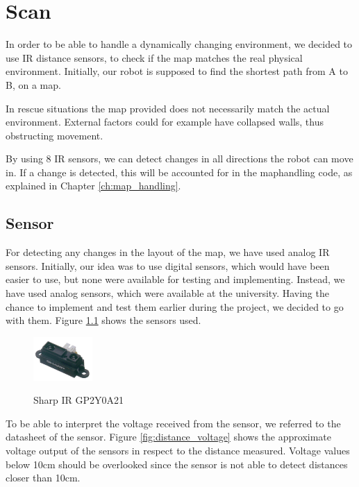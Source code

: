 \chapter{Scan}\label{ch:scan}
In order to be able to handle a dynamically changing environment,
we decided to use IR distance sensors,
to check if the map matches the real physical environment.
Initially, our robot is supposed to find the 
shortest path from A to B, on a map.

In rescue situations the map provided does not necessarily match 
the actual environment.
External factors could for example have collapsed walls,
thus obstructing movement.

By using 8 IR sensors, we can detect changes in all directions 
the robot can move in. If a change is detected, this will be
accounted for in the maphandling code,
as explained in Chapter \ref{ch:map_handling}.

\newpage
\section{Sensor}\label{sec:sensor}
For detecting any changes in the layout of the map, we have used analog IR 
sensors. Initially, our idea was to use digital sensors, which would have been 
easier to use, but none were available for testing and implementing. Instead, 
we have used analog sensors, which were available at the university. Having the 
chance to implement and test them earlier during the project, we decided to go 
with them. 
Figure \ref{fig:sensor} shows the sensors used.

\begin{figure}[htp]
	\centering
	\includegraphics[width=0.2\textwidth]{figures/scan/Sensor.png}
	\caption{Sharp IR GP2Y0A21} \cite{RobotShop3}
	\label{fig:sensor}
\end{figure}
%
To be able to interpret the voltage received from the sensor, we referred 
to the datasheet of the sensor. Figure \ref{fig:distance_voltage} shows
the approximate voltage output of the sensors in respect to the distance measured.
Voltage values below 10cm should be overlooked since the sensor is not able
to detect distances closer than 10cm.


